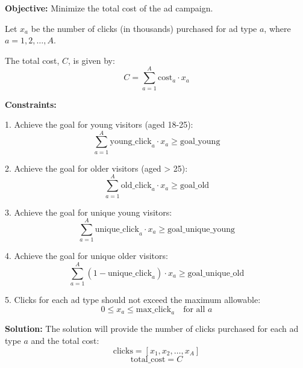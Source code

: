 \documentclass{article}
\begin{document}
\textbf{Objective:} Minimize the total cost of the ad campaign.

Let $x_a$ be the number of clicks (in thousands) purchased for ad type $a$, where $a = 1, 2, \ldots, A$.

The total cost, $C$, is given by:
\[
C = \sum_{a=1}^{A} \text{cost}_a \cdot x_a
\]

\textbf{Constraints:}

1. Achieve the goal for young visitors (aged 18-25):
\[
\sum_{a=1}^{A} \text{young\_click}_a \cdot x_a \geq \text{goal\_young}
\]

2. Achieve the goal for older visitors (aged > 25):
\[
\sum_{a=1}^{A} \text{old\_click}_a \cdot x_a \geq \text{goal\_old}
\]

3. Achieve the goal for unique young visitors:
\[
\sum_{a=1}^{A} \text{unique\_click}_a \cdot x_a \geq \text{goal\_unique\_young}
\]

4. Achieve the goal for unique older visitors:
\[
\sum_{a=1}^{A} (1 - \text{unique\_click}_a) \cdot x_a \geq \text{goal\_unique\_old}
\]

5. Clicks for each ad type should not exceed the maximum allowable:
\[
0 \leq x_a \leq \text{max\_click}_a \quad \text{for all } a
\]

\textbf{Solution:}
The solution will provide the number of clicks purchased for each ad type $a$ and the total cost:
\[
\text{clicks} = [x_1, x_2, \dots, x_A]
\]
\[
\text{total\_cost} = C
\]
\end{document}
